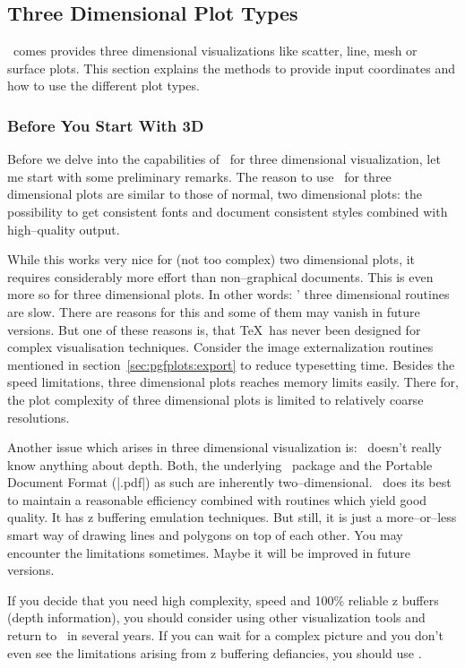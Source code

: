 \subsection{Three Dimensional Plot Types}
\PGFPlots\ comes provides three dimensional visualizations like scatter, line, mesh or surface plots. This section explains the methods to provide input coordinates and how to use the different plot types.

\subsubsection{Before You Start With 3D}
\label{pgfplots:3d:preliminary}
Before we delve into the capabilities of \PGFPlots\ for three dimensional visualization, let me start with some preliminary remarks. The reason to use \PGFPlots\ for three dimensional plots are similar to those of normal, two dimensional plots: the possibility to get consistent fonts and document consistent styles combined with high--quality output.

While this works very nice for (not too complex) two dimensional plots, it requires considerably more effort than non--graphical documents. This is even more so for three dimensional plots. In other words: \PGFPlots' three dimensional routines are slow. There are reasons for this and some of them may vanish in future versions. But one of these reasons is, that \TeX\ has never been designed for complex visualisation techniques. Consider the image externalization routines mentioned in section~\ref{sec:pgfplots:export} to reduce typesetting time. Besides the speed limitations, three dimensional plots reaches memory limits easily. There for, the plot complexity of three dimensional plots is limited to relatively coarse resolutions.

Another issue which arises in three dimensional visualization is: \PGFPlots\ doesn't really know anything about depth. Both, the underlying \PGF\ package and the Portable Document Format (|.pdf|) as such are inherently two--dimensional. \PGFPlots\ does its best to maintain a reasonable efficiency combined with routines which yield good quality. It has z buffering emulation techniques. But still, it is just a more--or--less smart way of drawing lines and polygons on top of each other. You may encounter the limitations sometimes. Maybe it will be improved in future versions.

If you decide that you need high complexity, speed and 100\% reliable z buffers (depth information), you should consider using other visualization tools and return to \PGFPlots\ in several years. If you can wait for a complex picture and you don't even see the limitations arising from z buffering defiancies, you should use \PGFPlots.

